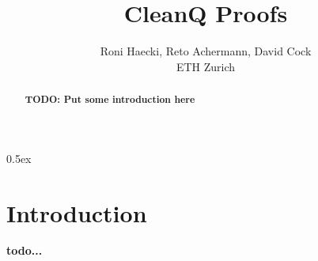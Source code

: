 \documentclass[11pt,a4paper]{article}
\begin{document}
\title{CleanQ Proofs}
\author{Roni Haecki, Reto Achermann, David Cock\\
ETH Zurich}
\maketitle


\begin{abstract}
\textbf{TODO: Put some introduction here}
\end{abstract}

\tableofcontents

\newpage

\renewcommand{\setisabellecontext}[1]{\markright{THEORY~``#1''}}

\parindent 0pt\parskip 0.5ex

\section{Introduction}
\textbf{todo...}



\pagestyle{headings}


\end{document}
